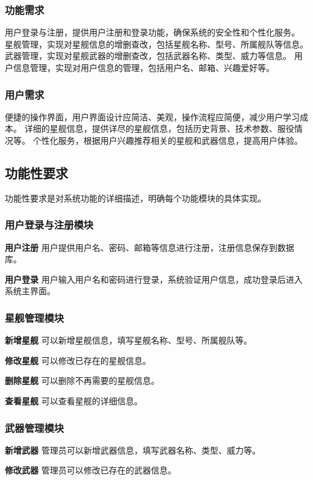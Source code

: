 \documentclass{base}
\begin{document}
\subsubsection{功能需求}
用户登录与注册，提供用户注册和登录功能，确保系统的安全性和个性化服务。
星舰管理，实现对星舰信息的增删查改，包括星舰名称、型号、所属舰队等信息。
武器管理，实现对星舰武器的增删查改，包括武器名称、类型、威力等信息。
用户信息管理，实现对用户信息的管理，包括用户名、邮箱、兴趣爱好等。
\subsubsection{用户需求}
便捷的操作界面，用户界面设计应简洁、美观，操作流程应简便，减少用户学习成本。
详细的星舰信息，提供详尽的星舰信息，包括历史背景、技术参数、服役情况等。
个性化服务，根据用户兴趣推荐相关的星舰和武器信息，提高用户体验。

\subsection{功能性要求}

功能性要求是对系统功能的详细描述，明确每个功能模块的具体实现。

\subsubsection{用户登录与注册模块}
\textbf{用户注册} 用户提供用户名、密码、邮箱等信息进行注册，注册信息保存到数据库。

\textbf{用户登录} 用户输入用户名和密码进行登录，系统验证用户信息，成功登录后进入系统主界面。

\subsubsection{星舰管理模块}

\textbf{新增星舰} 可以新增星舰信息，填写星舰名称、型号、所属舰队等。

\textbf{修改星舰} 可以修改已存在的星舰信息。

\textbf{删除星舰} 可以删除不再需要的星舰信息。

\textbf{查看星舰} 可以查看星舰的详细信息。

\subsubsection{武器管理模块}
\textbf{新增武器} 管理员可以新增武器信息，填写武器名称、类型、威力等。

\textbf{修改武器} 管理员可以修改已存在的武器信息。
\end{document}
